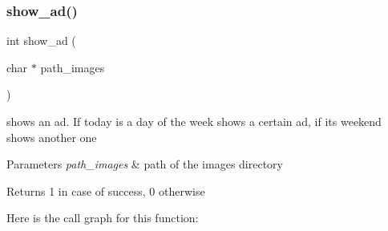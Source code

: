 \subsubsection{\texorpdfstring{show\+\_\+ad()}{show\_ad()}}
{\footnotesize\ttfamily int show\+\_\+ad (\begin{DoxyParamCaption}\item[{char $\ast$}]{path\+\_\+images }\end{DoxyParamCaption})}



shows an ad. If today is a day of the week shows a certain ad, if it\textquotesingle{}s weekend shows another one 


\begin{DoxyParams}{Parameters}
{\em path\+\_\+images} & path of the images directory \\
\hline
\end{DoxyParams}
\begin{DoxyReturn}{Returns}
1 in case of success, 0 otherwise 
\end{DoxyReturn}
Here is the call graph for this function\+:
